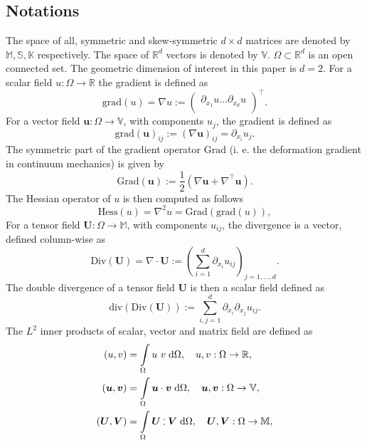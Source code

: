 \documentclass{ifacconf}
\def\onedot{$\mathsurround0pt\ldotp$}
\def\cddot{%
	\mathbin{\vcenter{\baselineskip.67ex
			\hbox{\onedot}\hbox{\onedot}}%
}}
\begin{document}
\subsection{Notations}
The space of all, symmetric and skew-symmetric $d\times d$ matrices are denoted by $\mathbb{M}, \mathbb{S}, \mathbb{K}$ respectively. The space of $\mathbb{R}^d$ vectors is denoted by $\mathbb{V}$. $\Omega \subset \mathbb{R}^d$ is an open connected set. The geometric dimension of interest in this paper is $d=2$. For a scalar field $u: \Omega \rightarrow \mathbb{R}$ the gradient is defined as 
\begin{equation*}
\mathrm{grad}(u) =  \nabla u := \begin{pmatrix}
\partial_{x_1} u \dots \partial_{x_d} u \\
\end{pmatrix}^\top.
\end{equation*}
For a vector field $\bm{u}: \Omega \rightarrow \mathbb{V}$, with components $u_j$, the gradient is defined as
\begin{equation*}
\mathrm{grad}(\bm{u})_{i j}:= (\nabla \bm{u})_{ij} = \partial_{x_i} u_j.
\end{equation*}
The symmetric part of the gradient operator $\mathrm{Grad}$ (i. e. the deformation gradient in continuum mechanics) is given by
\begin{equation*}
\mathrm{Grad}(\bm{u}) := \frac{1}{2} \left(\nabla \bm{u} + \nabla^\top \bm{u} \right).
\end{equation*}
The Hessian operator of $u$ is then computed as follows
\begin{equation*}
\mathrm{Hess}(u) = \nabla^2 u = \mathrm{Grad}(\mathrm{grad}(u)),
\end{equation*}
For a tensor field $\bm{U}: \Omega \rightarrow \mathbb{M}$, with components $u_{ij}$, the divergence is a vector, defined column-wise as
\begin{equation*}
\mathrm{Div}(\bm U) = \nabla \cdot \bm{U} := \left( \sum_{i = 1}^d \partial_{x_i} u_{ij} \right)_{j = 1, \dots, d}.
\end{equation*}
The double divergence of a tensor field $\bm{U}$ is then a scalar field defined as
\begin{equation*}
\mathrm{div}(\mathrm{Div}(\bm U)):= \sum_{i, j = 1}^d \partial_{x_i} \partial_{x_j} u_{ij}.
\end{equation*}
The $L^2$ inner products of scalar, vector and matrix field are defined as
\begin{align*}
	(u, v) &= \int_{\Omega} u \ v \d\Omega, \quad u, v : \Omega \rightarrow \mathbb{R}, \\
	(\bm{u}, \bm{v}) &= \int_{\Omega} \bm{u} \cdot \bm{v} \d\Omega, \quad \bm{u}, \bm{v} : \Omega \rightarrow \mathbb{V}, \\
	(\bm{U}, \bm{V}) &= \int_{\Omega} \bm{U} \cddot \bm{V} \d\Omega, \quad \bm{U}, \bm{V} : \Omega \rightarrow \mathbb{M},
\end{align*}
\end{document}
